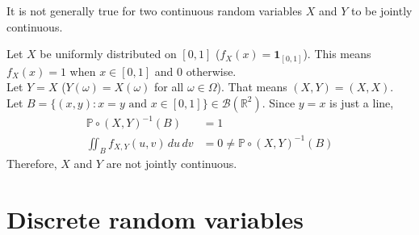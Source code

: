 \documentclass{huhtakm-template-book}
\newcommand{\prob}{\mathbb{P}}
\begin{document}
    \begin{rem}
        It is not generally true for two continuous random variables $X$ and $Y$ to be jointly continuous.
    \end{rem}
    \begin{eg}
        Let $X$ be uniformly distributed on $[0,1]$ ($f_{X}(x)=\mathbf{1}_{[0,1]}$). This means $f_{X}(x)=1$ when $x\in[0,1]$ and $0$ otherwise.\\
        Let $Y=X$ ($Y(\omega)=X(\omega)$ for all $\omega\in\Omega$). That means $(X,Y)=(X,X)$.\\
        Let $B=\{(x,y):x=y\text{ and }x\in[0,1]\}\in\mathcal{B}(\mathbb{R}^{2})$. Since $y=x$ is just a line,
        \begin{align*}
            \prob\circ(X,Y)^{-1}(B)&=1\\
            \iint_{B}f_{X,Y}(u,v)\,du\,dv&=0\neq\prob\circ(X,Y)^{-1}(B)
        \end{align*}
        Therefore, $X$ and $Y$ are not jointly continuous.
    \end{eg}
    
\newpage
\chapter{Discrete random variables}
\end{document}
